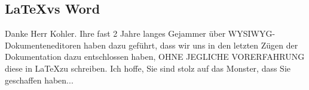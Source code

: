 \subsection{\LaTeX vs Word}\label{fz_LatexVsWord}
Danke Herr Kohler. 
Ihre fast 2 Jahre langes Gejammer über WYSIWYG-Dokumenteneditoren haben dazu geführt, dass wir uns in den letzten Zügen der Dokumentation dazu entschlossen haben, OHNE JEGLICHE VORERFAHRUNG diese in \LaTeX zu schreiben. 
Ich hoffe, Sie sind stolz auf das Monster, dass Sie geschaffen haben...
\newpage